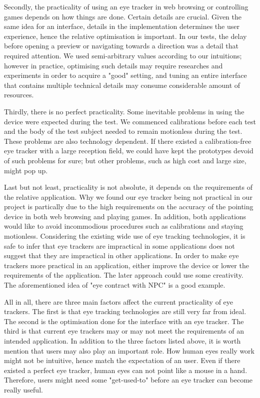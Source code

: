 \documentclass[english]{tktltiki}
\begin{document}
Secondly, the practicality of using an eye tracker in web browsing or controlling games depends on how things are done. Certain details are crucial. Given the same idea for an interface, details in the implementation determines the user experience, hence the relative optimisation is important. In our tests, the delay before opening a preview or navigating towards a direction was a detail that required attention. We used semi-arbitrary values according to our intuitions; however in practice, optimising such details may require researches and experiments in order to acquire a "good" setting, and tuning an entire interface that contains multiple technical details may consume considerable amount of resources. 

Thirdly, there is no perfect practicality. Some inevitable problems in using the device were expected during the test. We commenced calibrations before each test and the body of the test subject needed to remain motionless during the test. These problems are also technology dependent. If there existed a calibration-free eye tracker with a large reception field, we could have kept the prototypes devoid of such problems for sure; but other problems, such as high cost and large size,  might pop up. 

Last but not least, practicality is not absolute, it depends on the requirements of the relative application. Why we found our eye tracker being not practical in our project is partically due to the high requirements on the accuracy of the pointing device in both web browsing and playing games. In addition, both applications would like to avoid incommodious procedures such as calibrations and staying motionless. Considering the existing wide use of eye tracking technologies, it is safe to infer that eye trackers are impractical in some applications does not suggest that they are impractical in other applications. In order to make eye trackers more practical in an application, either improve the device or lower the requirements of the application. The later approach could use some creativity. The aforementioned idea of "eye contract with NPC" is a good example. 

All in all, there are three main factors affect the current practicality of eye trackers. The first is that eye tracking technologies are still very far from ideal. The second is the optimisation done for the interface with an eye tracker. The third is that current eye trackers may or may not meet the requirements of an intended application. In addition to the three factors listed above, it is worth mention that users may also play an important role. How human eyes really work might not be intuitive, hence match the expectation of an user. Even if there existed a perfect eye tracker, human eyes can not point like a mouse in a hand. Therefore, users might need some "get-used-to" before an eye tracker can become really useful. 
\end{document}
